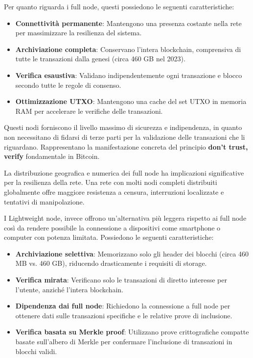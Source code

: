 Per quanto riguarda i full node, questi possiedono le seguenti caratteristiche:
\begin{itemize}
    \item \textbf{Connettività permanente}: Mantengono una presenza costante nella rete per massimizzare la resilienza del sistema.
    \item \textbf{Archiviazione completa}: Conservano l'intera blockchain, comprensiva di tutte le transazioni dalla genesi (circa 460 GB nel 2023).
    \item \textbf{Verifica esaustiva}: Validano indipendentemente ogni transazione e blocco secondo tutte le regole di consenso.
    \item \textbf{Ottimizzazione UTXO}: Mantengono una cache del set UTXO in memoria RAM per accelerare le verifiche delle transazioni.
\end{itemize}
Questi nodi forniscono il livello massimo di sicurezza e indipendenza, in quanto non necessitano di fidarsi di terze parti per la validazione delle transazioni che li riguardano. Rappresentano la manifestazione concreta del principio \textbf{don't trust, verify} fondamentale in Bitcoin.

La distribuzione geografica e numerica dei full node ha implicazioni significative per la resilienza della rete. Una rete con molti nodi completi distribuiti globalmente offre maggiore resistenza a censura, interruzioni localizzate e tentativi di manipolazione.

I Lightweight node, invece offrono un'alternativa più leggera rispetto ai full node così da rendere possibile la connessione a dispositivi come smartphone o computer con potenza limitata. Possiedono le seguenti caratteristiche:
\begin{itemize}
    \item \textbf{Archiviazione selettiva}: Memorizzano solo gli header dei blocchi (circa 460 MB vs. 460 GB), riducendo drasticamente i requisiti di storage.
    \item \textbf{Verifica mirata}: Verificano solo le transazioni di diretto interesse per l'utente, anziché l'intera blockchain.
    \item \textbf{Dipendenza dai full node}: Richiedono la connessione a full node per ottenere dati sulle transazioni specifiche e le relative prove di inclusione.
    \item \textbf{Verifica basata su Merkle proof}: Utilizzano prove crittografiche compatte basate sull’albero di Merkle per confermare l’inclusione di transazioni in blocchi validi.
\end{itemize}

